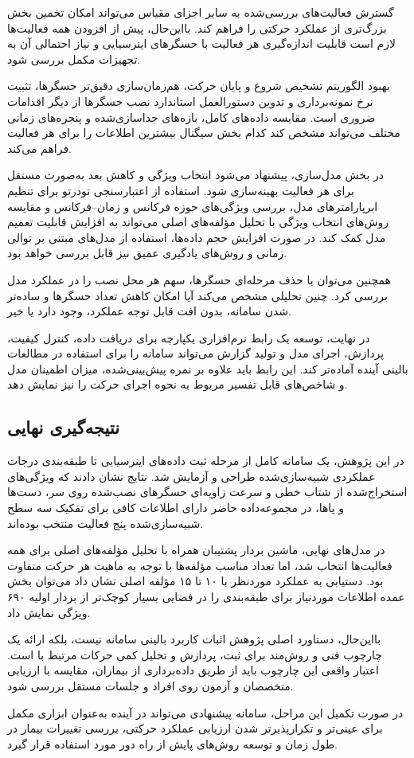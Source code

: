 گسترش فعالیت‌های بررسی‌شده به سایر اجزای مقیاس  می‌تواند امکان تخمین بخش بزرگ‌تری از عملکرد حرکتی را فراهم کند. بااین‌حال، پیش از افزودن همه فعالیت‌ها لازم است قابلیت اندازه‌گیری هر فعالیت با حسگرهای اینرسیایی و نیاز احتمالی آن به تجهیزات مکمل بررسی شود.

بهبود الگوریتم تشخیص شروع و پایان حرکت، هم‌زمان‌سازی دقیق‌تر حسگرها، تثبیت نرخ نمونه‌برداری و تدوین دستورالعمل استاندارد نصب حسگرها از دیگر اقدامات ضروری است. مقایسه داده‌های کامل، بازه‌های جداسازی‌شده و پنجره‌های زمانی مختلف می‌تواند مشخص کند کدام بخش سیگنال بیشترین اطلاعات را برای هر فعالیت فراهم می‌کند.

در بخش مدل‌سازی، پیشنهاد می‌شود انتخاب ویژگی و کاهش بعد به‌صورت مستقل برای هر فعالیت بهینه‌سازی شود. استفاده از اعتبارسنجی تو‌در‌تو برای تنظیم ابرپارامترهای مدل، بررسی ویژگی‌های حوزه فرکانس و زمان--فرکانس و مقایسه روش‌های انتخاب ویژگی با تحلیل مؤلفه‌های اصلی می‌تواند به افزایش قابلیت تعمیم مدل کمک کند. در صورت افزایش حجم داده‌ها، استفاده از مدل‌های مبتنی بر توالی زمانی و روش‌های یادگیری عمیق نیز قابل بررسی خواهد بود.

همچنین می‌توان با حذف مرحله‌ای حسگرها، سهم هر محل نصب را در عملکرد مدل بررسی کرد. چنین تحلیلی مشخص می‌کند آیا امکان کاهش تعداد حسگرها و ساده‌تر شدن سامانه، بدون افت قابل توجه عملکرد، وجود دارد یا خیر.

در نهایت، توسعه یک رابط نرم‌افزاری یکپارچه برای دریافت داده، کنترل کیفیت، پردازش، اجرای مدل و تولید گزارش می‌تواند سامانه را برای استفاده در مطالعات بالینی آینده آماده‌تر کند. این رابط باید علاوه بر نمره پیش‌بینی‌شده، میزان اطمینان مدل و شاخص‌های قابل تفسیر مربوط به نحوه اجرای حرکت را نیز نمایش دهد.

\subsection{نتیجه‌گیری نهایی}

در این پژوهش، یک سامانه کامل از مرحله ثبت داده‌های اینرسیایی تا طبقه‌بندی درجات عملکردی شبیه‌سازی‌شده طراحی و آزمایش شد. نتایج نشان دادند که ویژگی‌های استخراج‌شده از شتاب خطی و سرعت زاویه‌ای حسگرهای نصب‌شده روی سر، دست‌ها و پاها، در مجموعه‌داده حاضر دارای اطلاعات کافی برای تفکیک سه سطح شبیه‌سازی‌شده پنج فعالیت منتخب بوده‌اند.

در مدل‌های نهایی، ماشین بردار پشتیبان همراه با تحلیل مؤلفه‌های اصلی برای همه فعالیت‌ها انتخاب شد، اما تعداد مناسب مؤلفه‌ها با توجه به ماهیت هر حرکت متفاوت بود. دستیابی به عملکرد موردنظر با ۱۰ تا ۱۵ مؤلفه اصلی نشان داد می‌توان بخش عمده اطلاعات موردنیاز برای طبقه‌بندی را در فضایی بسیار کوچک‌تر از بردار اولیه ۶۹۰ ویژگی نمایش داد.

بااین‌حال، دستاورد اصلی پژوهش اثبات کاربرد بالینی سامانه نیست، بلکه ارائه یک چارچوب فنی و روش‌مند برای ثبت، پردازش و تحلیل کمی حرکات مرتبط با  است. اعتبار واقعی این چارچوب باید از طریق داده‌برداری از بیماران، مقایسه با ارزیابی متخصصان و آزمون روی افراد و جلسات مستقل بررسی شود.

در صورت تکمیل این مراحل، سامانه پیشنهادی می‌تواند در آینده به‌عنوان ابزاری مکمل برای عینی‌تر و تکرارپذیرتر شدن ارزیابی عملکرد حرکتی، بررسی تغییرات بیمار در طول زمان و توسعه روش‌های پایش از راه دور مورد استفاده قرار گیرد.